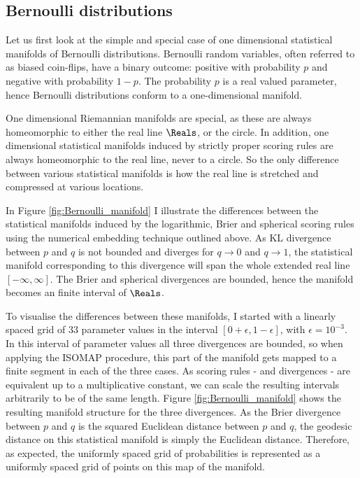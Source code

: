 \subsection{Bernoulli distributions}

Let us first look at the simple and special case of one dimensional statistical manifolds of Bernoulli distributions. Bernoulli random variables, often referred to as biased coin-flips, have a binary outcome: positive with probability $p$ and negative with probability $1-p$. The probability $p$ is a real valued parameter, hence Bernoulli distributions conform to a one-dimensional manifold.

One dimensional Riemannian manifolds are special, as these are always homeomorphic to either the real line $\Reals$, or the circle. In addition, one dimensional statistical manifolds induced by strictly proper scoring rules are always homeomorphic to the real line, never to a circle. So the only difference between various statistical manifolds is how the real line is stretched and compressed at various locations.

In Figure \ref{fig:Bernoulli_manifold} I illustrate the differences between the statistical manifolds induced by the logarithmic, Brier and spherical scoring rules using the numerical embedding technique outlined above. As KL divergence between $p$ and $q$ is not bounded and diverges for $q\rightarrow 0$ and $q\rightarrow 1$, the statistical manifold corresponding to this divergence will span the whole extended real line $[-\infty,\infty]$. The Brier and spherical divergences are bounded, hence the manifold becomes an finite interval of $\Reals$.

To visualise the differences between these manifolds, I started with a linearly spaced grid of $33$ parameter values in the interval $[0+\epsilon,1-\epsilon]$, with $\epsilon = 10^{-3}$. In this interval of parameter values all three divergences are bounded, so when applying the ISOMAP procedure, this part of the manifold gets mapped to a finite segment in each of the three cases. As scoring rules - and divergences - are equivalent up to a multiplicative constant, we can scale the resulting intervals arbitrarily to be of the same length. Figure \ref{fig:Bernoulli_manifold} shows the resulting manifold structure for the three divergences. As the Brier divergence between $p$ and $q$ is the squared Euclidean distance between $p$ and $q$, the geodesic distance on this statistical manifold is simply the Euclidean distance. Therefore, as expected, the uniformly spaced grid of probabilities is represented as a uniformly spaced grid of points on this map of the manifold.

